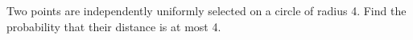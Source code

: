 Two points are independently uniformly selected on a circle of radius 4. Find the probability that their distance is at most 4.
